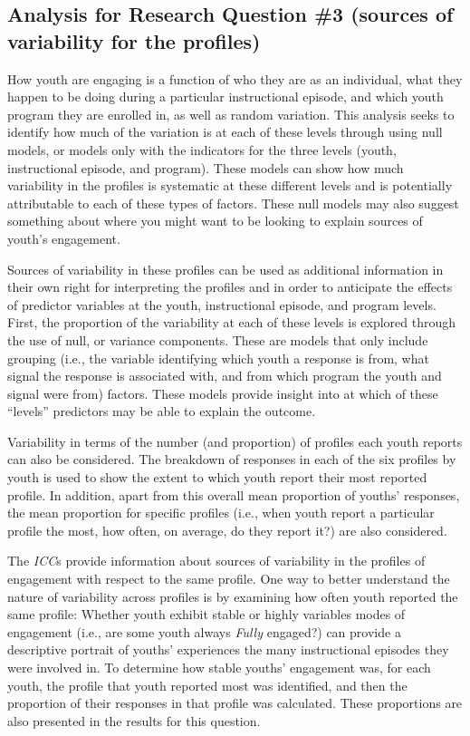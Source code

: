 \documentclass[]{msu-thesis}
\theoremstyle{definition}
\theoremstyle{definition}
\theoremstyle{definition}
\theoremstyle{remark}
\begin{document}
\subsection{Analysis for Research Question \#3 (sources of variability
for the
profiles)}\label{analysis-for-research-question-3-sources-of-variability-for-the-profiles}

How youth are engaging is a function of who they are as an individual,
what they happen to be doing during a particular instructional episode,
and which youth program they are enrolled in, as well as random
variation. This analysis seeks to identify how much of the variation is
at each of these levels through using null models, or models only with
the indicators for the three levels (youth, instructional episode, and
program). These models can show how much variability in the profiles is
systematic at these different levels and is potentially attributable to
each of these types of factors. These null models may also suggest
something about where you might want to be looking to explain sources of
youth's engagement.

Sources of variability in these profiles can be used as additional
information in their own right for interpreting the profiles and in
order to anticipate the effects of predictor variables at the youth,
instructional episode, and program levels. First, the proportion of the
variability at each of these levels is explored through the use of null,
or variance components. These are models that only include grouping
(i.e., the variable identifying which youth a response is from, what
signal the response is associated with, and from which program the youth
and signal were from) factors. These models provide insight into at
which of these ``levels'' predictors may be able to explain the outcome.

Variability in terms of the number (and proportion) of profiles each
youth reports can also be considered. The breakdown of responses in each
of the six profiles by youth is used to show the extent to which youth
report their most reported profile. In addition, apart from this overall
mean proportion of youths' responses, the mean proportion for specific
profiles (i.e., when youth report a particular profile the most, how
often, on average, do they report it?) are also considered.

The \emph{ICC}s provide information about sources of variability in the
profiles of engagement with respect to the same profile. One way to
better understand the nature of variability across profiles is by
examining how often youth reported the same profile: Whether youth
exhibit stable or highly variables modes of engagement (i.e., are some
youth always \emph{Fully} engaged?) can provide a descriptive portrait
of youths' experiences the many instructional episodes they were
involved in. To determine how stable youths' engagement was, for each
youth, the profile that youth reported most was identified, and then the
proportion of their responses in that profile was calculated. These
proportions are also presented in the results for this question.
\end{document}
